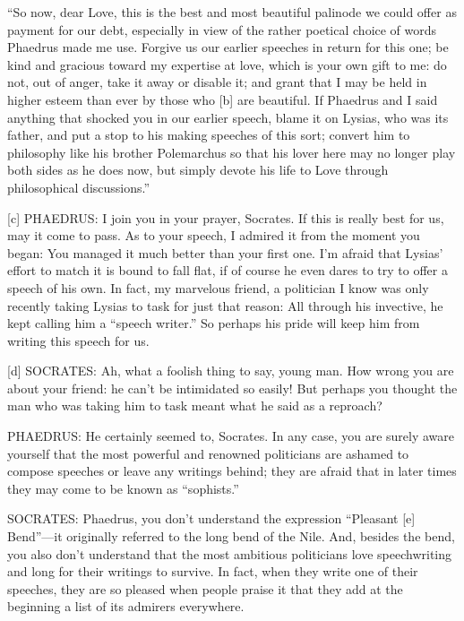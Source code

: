 “So now, dear Love, this is the best and most beautiful
palinode we could
offer as payment for our debt, especially in view of the rather poetical
choice of words Phaedrus made me
use. Forgive us our
earlier speeches in return for this one; be kind and gracious toward my
expertise at love, which is your own gift to me: do not, out of anger,
take it away or disable it; and grant that I may be held in higher
esteem than ever by those who {[}b{]} are beautiful. If Phaedrus and I
said anything that shocked you in our earlier speech, blame it on
Lysias, who was its father, and put a stop to his making speeches of
this sort; convert him to philosophy like his brother Polemarchus so
that his lover here may no longer play both sides as he does now, but
simply devote his life to Love through philosophical discussions.”

{[}c{]} PHAEDRUS: I join you in your prayer, Socrates. If this is really
best for us, may it come to pass. As to your speech, I admired it from
the moment you began: You managed it much better than your first one.
I'm afraid that Lysias' effort to match it is bound to fall flat, if of
course he even dares to try to offer a speech of his own. In fact, my
marvelous friend, a politician I know was only recently taking Lysias to
task for just that reason: All through his invective, he kept calling
him a “speech writer.” So perhaps his pride will keep him from writing
this speech for us.

{[}d{]} SOCRATES: Ah, what a foolish thing to say, young man. How wrong
you are about your friend: he can't be intimidated so easily! But
perhaps you thought the man who was taking him to task meant what he
said as a reproach?

PHAEDRUS: He certainly seemed to, Socrates. In any case, you are surely
aware yourself that the most powerful and renowned politicians are
ashamed to compose speeches or leave any writings behind; they are
afraid that in later times they may come to be known as “sophists.”

SOCRATES: Phaedrus, you don't understand the expression “Pleasant
{[}e{]} Bend”---it originally referred to the long bend of the
Nile. And, besides the
bend, you also don't understand that the most ambitious politicians love
speechwriting and long for their writings to survive. In fact, when they
write one of their speeches, they are so pleased when people praise it
that they add at the beginning a list of its admirers everywhere.

